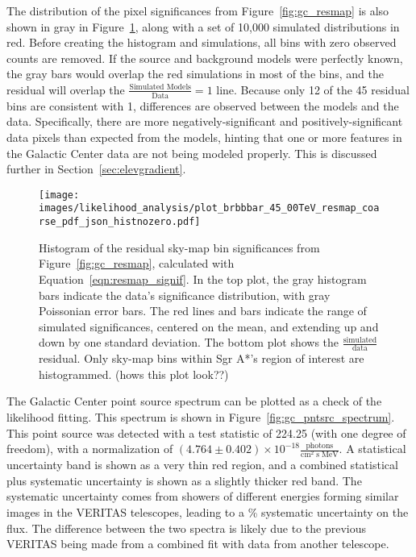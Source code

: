 The distribution of the pixel significances from Figure~\ref{fig:gc_resmap} is also shown in gray in Figure~\ref{fig:gc_resmap_sighist_coarse}, along with a set of 10,000 simulated distributions in red.
Before creating the histogram and simulations, all bins with zero observed counts are removed.
If the source and background models were perfectly known, the gray bars would overlap the red simulations in most of the bins, and the residual will overlap the ${\frac{\textrm{Simulated Models}}{\textrm{Data}}=1}$ line.
Because only 12 of the 45 residual bins are consistent with 1, differences are observed between the models and the data.
Specifically, there are more negatively-significant and positively-significant data pixels than expected from the models, hinting that one or more features in the Galactic Center data are not being modeled properly.
This is discussed further in Section~\ref{sec:elevgradient}.

\begin{figure}[ht]
  \centering
  \texttt{[image: images/likelihood\_analysis/plot\_brbbbar\_45\_00TeV\_resmap\_coarse\_pdf\_json\_histnozero.pdf]}
  \caption[Galactic Center Residual Histogram]
  {
    Histogram of the residual sky-map bin significances from Figure~\ref{fig:gc_resmap}, calculated with Equation~\ref{eqn:resmap_signif}.
    In the top plot, the gray histogram bars indicate the data’s significance distribution, with gray Poissonian error bars.
     The red lines and bars indicate the range of simulated significances, centered on the mean, and extending up and down by one standard deviation.
    The bottom plot shows the $\frac{\textrm{simulated}}{\textrm{data}}$ residual.
    Only sky-map bins within Sgr A*'s region of interest are histogrammed.
    {\color{red}(hows this plot look??)}
  }
  \label{fig:gc_resmap_sighist_coarse}
\end{figure}

The Galactic Center point source spectrum can be plotted as a check of the likelihood fitting.
This spectrum is shown in Figure~\ref{fig:gc_pntsrc_spectrum}.
This point source was detected with a test statistic of 224.25 (with one degree of freedom), with a normalization of $(4.764\pm0.402)\times 10^{-18} \frac{\textrm{photons}}{\textrm{cm}^2\;\textrm{s}\;\textrm{MeV}}$.
A statistical uncertainty band is shown as a very thin red region, and a combined statistical plus systematic uncertainty is shown as a slightly thicker red band.
The systematic uncertainty comes from showers of different energies forming similar images in the VERITAS telescopes, leading to a \% systematic uncertainty on the flux.
The difference between the two spectra is likely due to the previous VERITAS being made from a combined fit with data from another telescope.

